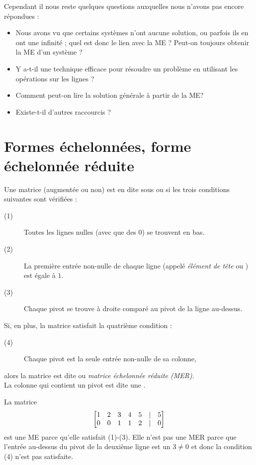 Cependant il nous reste quelques questions auxquelles nous n'avons pas encore répondues :
\begin{itemize}
\item Nous avons vu que certains systèmes n'ont aucune solution, ou parfois ils en ont une infinité ; quel est donc le lien avec la ME ? Peut-on toujours obtenir la
ME d'un système ?  
\item Y a-t-il une technique efficace pour résoudre un problème en utilisant les op\'erations sur les lignes ?
\item Comment peut-on lire la solution générale à partir de la ME?  
\item Existe-t-il d'autres raccourcis ?
\end{itemize}

\section{Formes échelonn\'ees, forme échelonn\'ee réduite}

 

\begin{definition}
Une matrice (augmentée ou non) est en dite sous  ou   si les trois conditions suivantes sont vérifiées :
\begin{description}
\item[(1)] Toutes les lignes nulles (avec que des $0$) se trouvent en bas.
\item[(2)] La première entrée non-nulle de chaque ligne (appelé \emph{\'el\'ement de t\^ete} ou ) est égale à $1$.
\item[(3)] Chaque pivot se trouve à droite comparé au pivot de la ligne au-dessus.
\end{description}
Si, en plus, la matrice satisfait la quatrième condition :
\begin{description}
\item[(4)] Chaque pivot est la seule entrée non-nulle de sa colonne,
\end{description}
alors la matrice est dite  ou \emph{matrice \'echelonn\'ee r\'eduite (MER)}.\\
La colonne qui contient un pivot est dite une .
\end{definition}

\begin{myexample} La matrice
$$
\left[ \begin{matrix} 1 & 2 & 3 & 4 & 5 &| & 5\\
0 & 0 & 1 & 1 & 2 & | & 0
 \end{matrix} \right]
$$
est une ME parce qu'elle satisfait (1)-(3).  Elle n'est pas une MER parce que l'entrée
au-dessus du pivot de la deuxième ligne est un $3\neq 0$ et donc la condition (4) n'est pas satisfaite.
\end{myexample}

